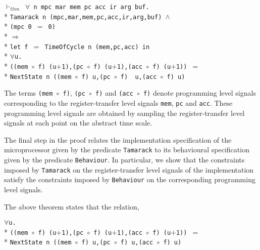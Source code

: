 \begin{normalsize}
\hspace*{\fill}
\begin{minipage}{17cm}
$\vdash_{thm}$\verb" "$\forall$\verb" n mpc mar mem pc acc ir arg buf."\\*
\verb"Tamarack n (mpc,mar,mem,pc,acc,ir,arg,buf) "$\wedge$\\*
\verb"(mpc 0 "$=$\verb" 0)"\\*
$\Longrightarrow$\\*
\verb"let f "$=$\verb" TimeOfCycle n (mem,pc,acc) in"\\*
$\forall$\verb"u."\\*
\verb"((mem "$\circ$\verb" f) (u"$+$\verb"1),(pc "$\circ$\verb" f) (u"$+$\verb"1),(acc "$\circ$\verb" f) (u"$+$\verb"1)) "$=$\\*
\verb"NextState n ((mem "$\circ$\verb" f) u,(pc "$\circ$\verb" f)  u,(acc "$\circ$\verb" f) u)"
\end{minipage}
\hspace*{\fill}

The terms \verb"(mem "$\circ$\verb" f)",
\verb"(pc "$\circ$\verb" f)" and \verb"(acc "$\circ$\verb" f)"
denote programming level signals corresponding to the register-transfer
level signals \verb"mem", \verb"pc" and \verb"acc".
These programming level signals are obtained by
sampling the register-transfer level signals at each point
on the abstract time scale.

The final step in the proof relates
the implementation specification of the microprocessor given by the
predicate \verb"Tamarack" to its behavioural specification
given by the predicate \verb"Behaviour".
In particular, we show that the constraints imposed by
\verb"Tamarack" on the register-transfer level signals
of the implementation satisfy the constraints imposed by
\verb"Behaviour" on the corresponding programming level signals.

The above theorem states that the relation,

\hspace*{\fill}
\begin{minipage}{120mm}
$\forall$\verb"u."\\*
\phantom{$\forall$\verb"u"}\verb"((mem "$\circ$\verb" f) (u"$+$\verb"1),(pc "$\circ$\verb" f) (u"$+$\verb"1),(acc "$\circ$\verb" f) (u"$+$\verb"1)) "$=$\\*
\phantom{$\forall$\verb"u"}\verb"NextState n ((mem "$\circ$\verb" f) u,(pc "$\circ$\verb" f) u,(acc "$\circ$\verb" f) u)"
\end{minipage}
\hspace*{\fill}


\end{normalsize}
